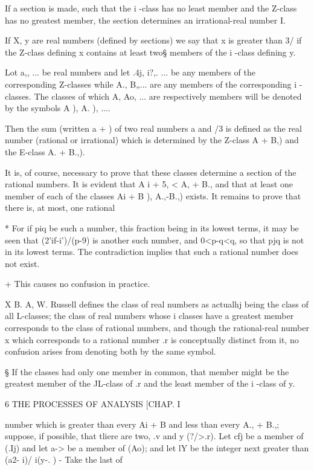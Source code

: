 If a section is made, such that the i -class has no least member and
the Z-class has no greatest member, the section determines an
irrational-real number I.

If X, y are real numbers (defined by sections) we say that x is
greater than 3/ if the Z-class defining x contains at least two§
members of the i -class defining y.

Lot a,, ... be real numbers and let .4j, i?,. ... be any members of
the corresponding Z-classes while A., B„... are any members of the
corresponding i -classes. The classes of which A, Ao, ... are
respectively members will be denoted by the symbols A ), A. ), ....

Then the sum (written a + ) of two real numbers a and /3 is defined as
the real number (rational or irrational) which is determined by the
Z-class A + B,) and the E-class A. + B.,).

It is, of course, necessary to prove that these classes determine a
section of the rational numbers. It is evident that A i + 5, < A, +
B., and that at least one member of each of the classes Ai + B ),
A.,-\-B.,) exists. It remains to prove that there is, at most, one
rational

* For if piq be such a number, this fraction being in its lowest
terms, it may be seen that (2'if-i')/(p-9) is another such number, and
0<p-q<q, so that pjq is not in its lowest terms. The contradiction
implies that such a rational number does not exist.

+ This causes no confusion in practice.

X B. A, W. Russell defines the class of real numbers as actualhj being
the class of all L-classes; the class of real numbers whose i classes
have a greatest member corresponds to the class of rational numbers,
and though the rational-real number x which corresponds to a rational
number .r is conceptually distinct from it, no confusion arises from
denoting both by the same symbol.

§ If the classes had only one member in common, that member might be
the greatest member of the JL-class of .r and the least member of the
i -class of y.

6 THE PROCESSES OF ANALYSIS [CHAP. I

number which is greater than every Ai + B and less than every A., +
B.,; suppose, if possible, that tliere are two, .v and y (?/>.r). Let
cfj be a member of (.Ij) and let a-> be a member of (Ao); and let lY
be the integer next greater than (a2- i)/ i(y-. ) - Take the last of

